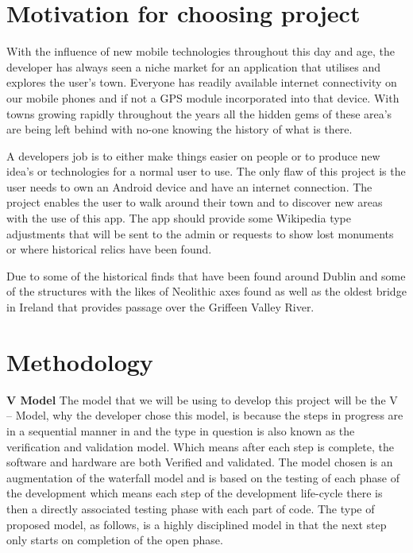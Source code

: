 \section{Motivation for choosing project}
With the influence of new mobile technologies throughout this day and age, the developer has always seen a niche market for an application that utilises and explores the user's town. Everyone has readily available internet connectivity on our mobile phones and if not a GPS module incorporated into that device. With towns growing rapidly throughout the years all the hidden gems of these area's are being left behind with no-one knowing the history of what is there.

A developers job is to either make things easier on people or to produce new idea's or technologies for a normal user to use. The only flaw of this project is the user needs to own an Android device and have an internet connection. The project enables the user to walk around their town and to discover new areas with the use of this app. The app should provide some Wikipedia type adjustments that will be sent to the admin or requests to show lost monuments or where historical relics have been found.

Due to some of the historical finds that have been found around Dublin and some of the structures with the likes of Neolithic axes found as well as the oldest bridge in Ireland that provides passage over the Griffeen Valley River.

\newpage

\section{Methodology}
\textbf{V Model}
The model that we will be using to develop this project will be the V – Model, why the developer chose this model, is because the steps in progress are in a sequential manner in and the type in question is also known as the verification and validation model. Which means after each step is complete, the software and hardware are both Verified and validated.
The model chosen is an augmentation of the waterfall model and is based on the testing of each phase of the development which means each step of the development life-cycle there is then a directly associated testing phase with each part of code. The type of proposed model, as follows, is a highly disciplined model in that the next step only starts on completion of the open phase.
\cite{TPoint}


